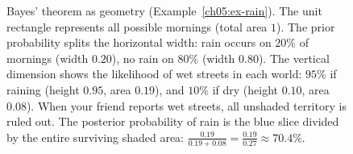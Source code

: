 \begin{figure}[H]
\caption{Bayes' theorem as geometry (Example~\ref{ch05:ex-rain}). The unit rectangle represents all possible mornings (total area $1$). The prior probability splits the horizontal width: rain occurs on $20\%$ of mornings (width $0.20$), no rain on $80\%$ (width $0.80$). The vertical dimension shows the likelihood of wet streets in each world: $95\%$ if raining (height $0.95$, area $0.19$), and $10\%$ if dry (height $0.10$, area $0.08$). When your friend reports wet streets, all unshaded territory is ruled out. The posterior probability of rain is the blue slice divided by the entire surviving shaded area: $\tfrac{0.19}{0.19 + 0.08} = \tfrac{0.19}{0.27} \approx 70.4\%$.}
\label{ch05:fig-bayes-geometry}
\end{figure}

